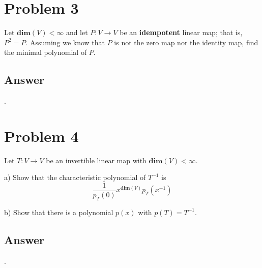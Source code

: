 \documentclass[
	12pt, %
]{fphw}
\newcommand\br{\vspace{10 pt}}
\newcommand\0{\mathbf{0}}
\renewcommand\dim[1]{\mathbf{dim}(#1)}
\begin{document}
\section*{Problem 3}
\begin{problem}
Let $\dim{V} < \infty$ and let $P: V \to V$ be an \textbf{idempotent} linear map; that is, $P^2 = P$. Assuming we know that $P$ is not the zero map nor the identity map, find the minimal polynomial of $P$.
\end{problem}

\subsection*{Answer} .\\

\newpage 
\section*{Problem 4}
\begin{problem}
Let $T : V \to V$ be an invertible linear map with $\dim{V} < \infty$.

\br
\noindent
a) Show that the characteristic polynomial of $T^{-1}$ is
\begin{equation*}
\frac{1}{p_T(0)}x^{\dim{V}}p_T(x^{-1})
\end{equation*}

\noindent
b) Show that there is a polynomial $p(x)$ with $p(T) =T^{-1}$.
\end{problem}

\subsection*{Answer} .\\


\end{document}
